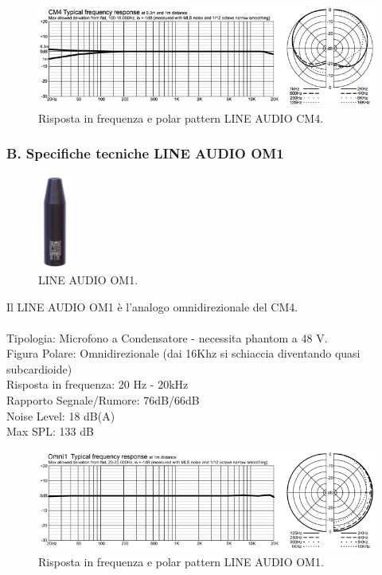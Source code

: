 \documentclass{article}
\begin{document}
    \begin{figure}[H]
        \includegraphics[width=1\textwidth]{images/CM4PLOT.jpg}
        \caption{\label{fig3}Risposta in frequenza e polar pattern LINE AUDIO CM4.}
    \end{figure}

\subsubsection{B. Specifiche tecniche LINE AUDIO OM1}
    \begin{figure}[H]
        \centering
        \includegraphics[width=0.1\textwidth]{images/Omni1.jpg}
        \caption{\label{fig4}LINE AUDIO OM1.}
    \end{figure}
    
    Il LINE AUDIO OM1 è l'analogo omnidirezionale del CM4.\\\\
    Tipologia: Microfono a Condensatore - necessita phantom a 48 V. \\
    Figura Polare: Omnidirezionale (dai 16Khz si schiaccia diventando quasi subcardioide)\\
    Risposta in frequenza: 20 Hz - 20kHz\\
    Rapporto Segnale/Rumore: 76dB/66dB\\
    Noise Level: 18 dB(A)\\
    Max SPL: 133 dB
    
    \begin{figure}[H]
        \includegraphics[width=1\textwidth]{images/Omni1plot.png}
        \caption{\label{fig5}Risposta in frequenza e polar pattern LINE AUDIO OM1.}
    \end{figure}
\end{document}
